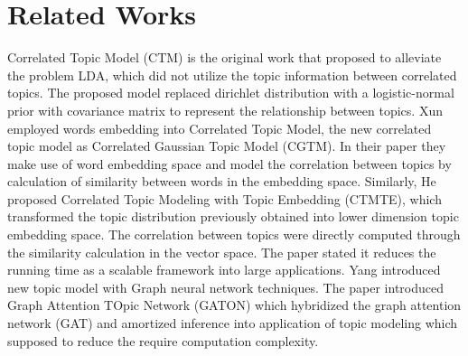 \section{Related Works}\label{AB}
Correlated Topic Model (CTM)\cite{blei_correlated_2007} is the original work that proposed to alleviate the problem LDA, which did not utilize the topic information between correlated topics. The proposed model replaced dirichlet distribution with a logistic-normal prior with covariance matrix to represent the relationship between topics.
Xun \cite{he_efficient_2017} employed words embedding into Correlated Topic Model, the new correlated topic model as Correlated Gaussian Topic Model (CGTM). In their paper they make use of word embedding space and model the correlation between topics by calculation of similarity between words in the embedding space.
Similarly, He\cite{xun_correlated_nodate} proposed Correlated Topic Modeling with Topic Embedding (CTMTE), which transformed the topic distribution previously obtained into lower dimension topic embedding space. The correlation between topics were directly computed through the similarity calculation in the vector space. The paper stated it reduces the running time as a scalable framework into large applications.
Yang\cite{yang_graph_2020} introduced new topic model with Graph neural network techniques. The paper introduced Graph Attention TOpic Network (GATON) which hybridized the graph attention network (GAT) and amortized inference into application of topic modeling which supposed to reduce the require computation complexity.

